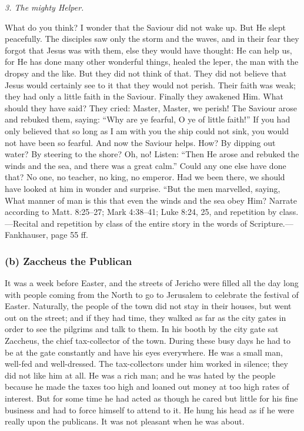 \emph{3. The mighty Helper.}

What do you think? I wonder that the Saviour did not wake up. But He slept peacefully. The disciples saw only the storm and the waves, and in their fear they forgot that Jesus was with them, else they would have thought: He can help us, for He has done many other wonderful things, healed the leper, the man with the dropsy and the like. But they did not think of that. They did not believe that Jesus would certainly see to it that they would not perish. Their faith was weak; they had only a little faith in the Saviour. Finally they awakened Him. What should they have said? They cried: Master, Master, we perish! The Saviour arose and rebuked them, saying: “Why are ye fearful, O ye of little faith!” If you had only believed that so long as I
am with you the ship could not sink, you would not have been so fearful. And now the Saviour helps. How? By dipping out water? By steering to the shore? Oh, no! Listen: “Then He arose and rebuked the winds and the sea, and there was a great calm.” Could any one else have done that? No one, no teacher, no king, no emperor. Had we been there, we should have looked at him in wonder and surprise. “But the men marvelled, saying, What manner of man is this that even the winds and the sea obey Him? Narrate according to Matt. 8:25–27; Mark 4:38–41; Luke 8:24, 25, and repetition by class.—Recital and repetition by class of the entire story in the words of Scripture.—Fankhauser, page 55 ff.

\subsubsection{(b) Zaccheus the Publican}

It was a week before Easter, and the streets of Jericho were filled all the day long with people coming from the North to go to Jerusalem to celebrate the festival of Easter. Naturally, the people of the town did not stay in their houses, but went out on the street; and if they had time, they walked as far as the city gates in order to see the pilgrims and talk to them. In his booth by the city gate sat Zaccheus, the chief tax-collector of the town. During these busy days he had to be at the gate constantly and have his eyes everywhere. He was a small man, well-fed and well-dressed. The tax-collectors under him worked in silence; they did not like him at all. He was a rich man; and he was hated by the people because he made the taxes too high and loaned out money at too high rates of interest. But for some time he had acted as though he cared but little for his fine business and had to force himself to attend to it. He hung his head as if he were really upon the publicans. It was not pleasant when he was about.

